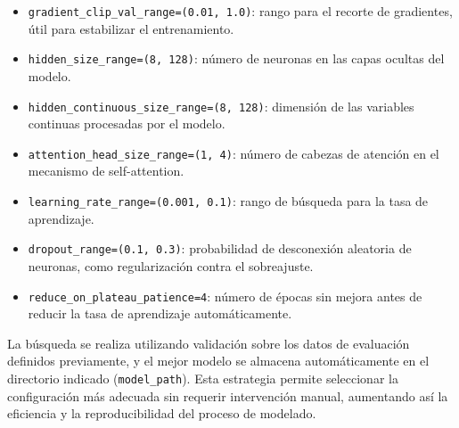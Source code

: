 \begin{itemize}
    \item \texttt{gradient\_clip\_val\_range=(0.01, 1.0)}: rango para el recorte de gradientes, útil para estabilizar el entrenamiento.
    \item \texttt{hidden\_size\_range=(8, 128)}: número de neuronas en las capas ocultas del modelo.
    \item \texttt{hidden\_continuous\_size\_range=(8, 128)}: dimensión de las variables continuas procesadas por el modelo.
    \item \texttt{attention\_head\_size\_range=(1, 4)}: número de cabezas de atención en el mecanismo de self-attention.
    \item \texttt{learning\_rate\_range=(0.001, 0.1)}: rango de búsqueda para la tasa de aprendizaje.
    \item \texttt{dropout\_range=(0.1, 0.3)}: probabilidad de desconexión aleatoria de neuronas, como regularización contra el sobreajuste.
    \item \texttt{reduce\_on\_plateau\_patience=4}: número de épocas sin mejora antes de reducir la tasa de aprendizaje automáticamente.
\end{itemize}

La búsqueda se realiza utilizando validación sobre los datos de evaluación definidos previamente, y el mejor modelo se almacena automáticamente en el directorio indicado (\texttt{model\_path}). Esta estrategia permite seleccionar la configuración más adecuada sin requerir intervención manual, aumentando así la eficiencia y la reproducibilidad del proceso de modelado.

%
%
%
